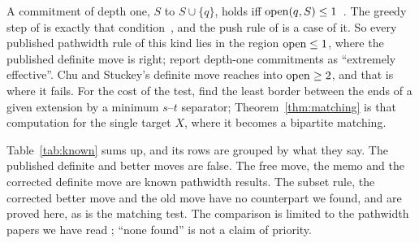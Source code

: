 A commitment of depth one, $S$ to $S\cup\{q\}$, holds iff
$\mathrm{open}(q,S)\le1$~. The greedy step of
\citet[Lemma~3, p.~49]{CoudertMazauricNisse2014} is exactly that
condition~, and the push rule of
\citet[Rule~1, p.~330]{SuchanVillanger2009} is a case of it. So every published
pathwidth rule of this kind lies in the region $\mathrm{open}\le1$, where the published
definite move is right; \citet[p.~388, Table~2]{KobayashiKomuroTamaki2014}
report depth-one commitments as ``extremely effective''. Chu and Stuckey's
definite move reaches into $\mathrm{open}\ge2$, and that is where it fails. For the
cost of the test, \citet[Cor.~2]{Kitsunai2016} find the least border between
the ends of a given extension by a minimum $s$--$t$ separator;
Theorem~\ref{thm:matching} is that computation for the single target $X$, where
it becomes a bipartite matching.

Table~\ref{tab:known} sums up, and its rows are grouped by what they say. The
published definite and better moves are false. The free move, the memo and
the corrected definite move are known pathwidth results. The subset rule, the corrected
better move and the old move have no counterpart we found, and are proved
here, as is the matching test. The comparison is limited to the pathwidth
papers we have read
\citep{SuchanVillanger2009,Bodlaender2012,CoudertMazauricNisse2014,CoudertMazauricNisse2016,KobayashiKomuroTamaki2014,Kitsunai2016};
``none found'' is not a claim of priority.


